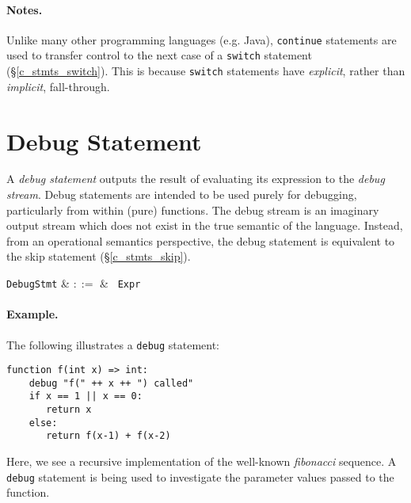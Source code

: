 \paragraph{Notes.} Unlike many other programming languages (e.g. Java), \lstinline{continue} statements are used to transfer control to the next case of a \lstinline{switch} statement (\S\ref{c_stmts_switch}).  This is because \lstinline{switch} statements have {\em explicit}, rather than {\em implicit}, fall-through.


\section{Debug Statement}
A {\em debug statement} outputs the result of evaluating its expression to the {\em debug stream}.  Debug statements are intended to be used purely for debugging, particularly from within (pure) functions.  The debug stream is an imaginary output stream which does not exist in the true semantic of the language.  Instead, from an operational semantics perspective, the debug statement is equivalent to the skip statement (\S\ref{c_stmts_skip}).

\begin{syntax}
  \verb+DebugStmt+ & $::=$ & \ \verb+Expr+\\
\end{syntax}

\paragraph{Example.} The following illustrates a \lstinline{debug} statement:

\begin{lstlisting}
function f(int x) => int:
    debug "f(" ++ x ++ ") called"
    if x == 1 || x == 0:
       return x
    else:
       return f(x-1) + f(x-2)
\end{lstlisting}
Here, we see a recursive implementation of the well-known {\em fibonacci} sequence.  A \lstinline{debug} statement is being used to investigate the parameter values passed to the function.


